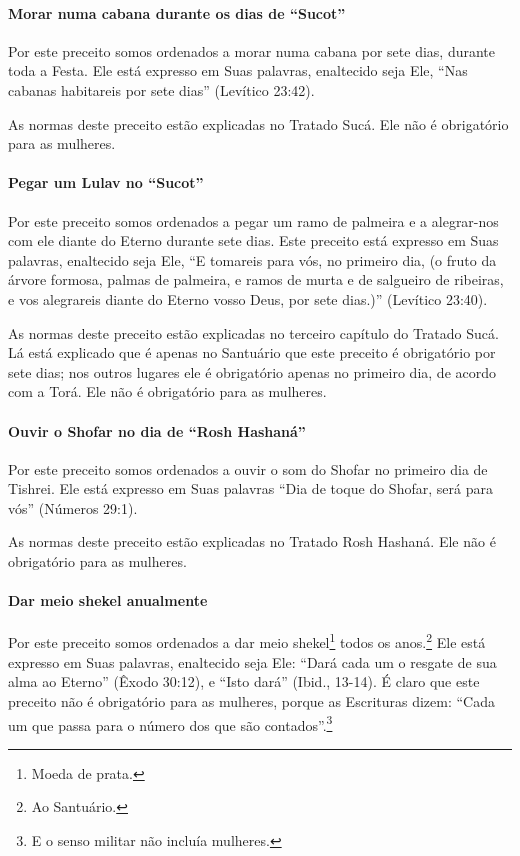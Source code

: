 \paragraph{Morar numa cabana durante os dias de ``Sucot''}

Por este preceito somos ordenados a morar numa cabana por sete dias,
durante toda a Festa. Ele está expresso em Suas palavras, enaltecido
seja Ele, ``Nas cabanas habitareis por sete dias'' (Levítico 23:42).

As normas deste preceito estão explicadas no Tratado Sucá. Ele não é
obrigatório para as mulheres.

\paragraph{Pegar um Lulav no ``Sucot''}

Por este preceito somos ordenados a pegar um ramo de palmeira e a
alegrar-nos com ele diante do Eterno durante sete dias. Este preceito
está expresso em Suas palavras, enaltecido seja Ele, ``E tomareis para
vós, no primeiro dia, (o fruto da árvore formosa, palmas de palmeira, e
ramos de murta e de salgueiro de ribeiras, e vos alegrareis diante do
Eterno vosso Deus, por sete dias.)'' (Levítico 23:40).

As normas deste preceito estão explicadas no terceiro capítulo do
Tratado Sucá. Lá está explicado que é apenas no Santuário que este
preceito é obrigatório por sete dias; nos outros lugares ele é
obrigatório apenas no primeiro dia, de acordo com a Torá. Ele não é
obrigatório para as mulheres.

\paragraph{Ouvir o Shofar no dia de ``Rosh Hashaná''}

Por este preceito somos ordenados a ouvir o som do Shofar no
primeiro dia de Tishrei. Ele está expresso em Suas palavras ``Dia de
toque do Shofar, será para vós'' (Números 29:1).

As normas deste preceito estão explicadas no Tratado Rosh Hashaná. Ele
não é obrigatório para as mulheres.

\paragraph{Dar meio shekel anualmente}

Por este preceito somos ordenados a dar meio
shekel\footnote{Moeda de prata.} todos os anos.\footnote{Ao Santuário.}
Ele está expresso em Suas palavras, enaltecido seja Ele: ``Dará cada um
o resgate de sua alma ao Eterno'' (Êxodo 30:12), e ``Isto dará'' (Ibid.,
13-14). É claro que este preceito não é obrigatório para as mulheres,
porque as Escrituras dizem: ``Cada um que passa para o número dos que
são contados''.\footnote{E o senso militar não incluía mulheres.}

